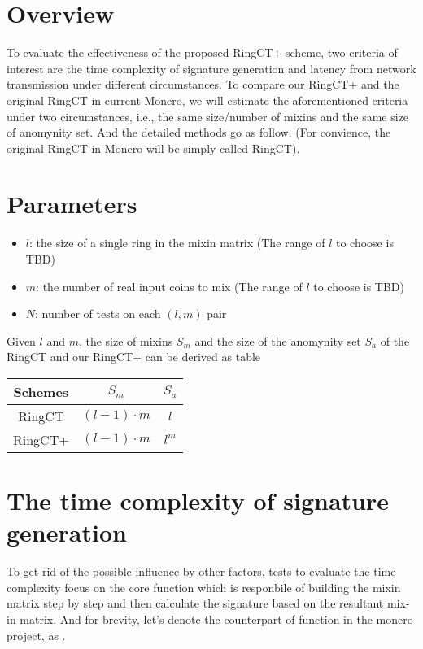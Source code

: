 \section{Overview}
To evaluate the effectiveness of the proposed RingCT+ scheme, two criteria of interest are the time complexity of signature generation and latency from network transmission under different circumstances. To compare our RingCT+ and the original RingCT in current Monero, we will estimate the aforementioned criteria under two circumstances, i.e., the same size/number of mixins and the same size of anomynity set. And the detailed methods go as follow. (For convience, the original RingCT in Monero will be simply called RingCT).
\section{Parameters}
	\begin{itemize}
		\item \(l\): the size of a single ring in the mixin matrix (The range of \(l\) to choose is TBD)
		\item \(m\): the number of real input coins to mix (The range of \(l\) to choose is TBD)
		\item \(N\): number of tests on each \( (l,m)\) pair
	\end{itemize}
	Given \(l\) and \(m\), the size of mixins \(S_m\) and the size of the anomynity set \(S_a\) of the RingCT and our RingCT+ can be derived as table
	\begin{table}[!htbp]
		\centering
		\begin{tabular}{ccc}
			\hline
			Schemes & \(S_m\) & \(S_a\) \\
			\hline
			RingCT & \((l-1)\cdot m\) & \(l\) \\
			RingCT+ & \( (l-1)\cdot m\) & \(l^m\) \\
			\hline
		\end{tabular}
	\end{table}
\section{The time complexity of signature generation}
To get rid of the possible influence by other factors, tests to evaluate the time complexity focus on the core function  which is responbile of building the mixin matrix step by step and then calculate the signature based on the resultant mix-in matrix. And for brevity, let's denote the counterpart of function  in the monero project, as .
